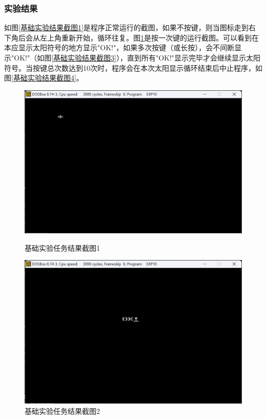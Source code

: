 \documentclass[12pt, a4paper, oneside]{ctexart}
\begin{document}
\subsubsection{实验结果}
如图\ref{基础实验结果截图1}是程序正常运行的截图，如果不按键，则当图标走到右下角后会从左上角重新开始，循环往复。图\ref{基础实验结果截图2}是按一次键的运行截图。可以看到在本应显示太阳符号的地方显示"OK!"，如果多次按键（或长按），会不间断显示"OK!"（如图\ref{基础实验结果截图3}），直到所有"OK!"显示完毕才会继续显示太阳符号。当按键总次数达到10次时，程序会在本次太阳显示循环结束后中止程序，如图\ref{基础实验结果截图4}。
\begin{figure}[H]
    \centering
    \begin{minipage}{0.45\textwidth}
    \centering
    \includegraphics[scale=0.48]{pic/exp10-1.png}
    \caption{基础实验任务结果截图1}
    \label{基础实验结果截图1}
    \end{minipage}
    \hspace{0.05\textwidth}
    \begin{minipage}{0.45\textwidth}
    \centering
    \includegraphics[scale=0.48]{pic/exp10-2.png}
    \caption{基础实验任务结果截图2}
    \label{基础实验结果截图2}
    \end{minipage}
\end{figure}
\end{document}
